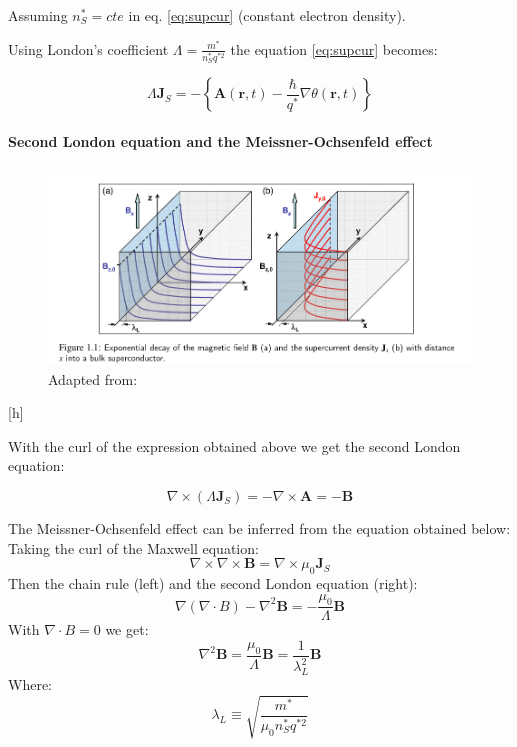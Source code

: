 \documentclass[12pt]{article}
\numberwithin{equation}{subsection}
\begin{document}
Assuming $n^*_S = cte$  in eq. \ref{eq:supcur}  (constant electron density). 


Using London's coefficient $\Lambda = \frac{m^*}{n^*_Sq^{*2}}$ the equation \ref{eq:supcur} becomes:

\begin{equation}
    \Lambda \mathbf J_S = - \left \{ \mathbf A(\mathbf r, t) -\frac{\hbar}{q^*}\nabla\theta (\mathbf r, t) \right \}
    \label{eq:supercurrent}
\end{equation}

\paragraph{Second London equation and the Meissner-Ochsenfeld effect\\}

\begin{figure}[h]
\includegraphics[scale=1.6]{images/second-london.png}
\caption{Adapted from: \cite{gross2016applied}}
\end{figure}[h]

With the curl of the expression obtained above we get the second London equation:

\begin{equation}
    \nabla \times (\Lambda \mathbf J_S) = -\nabla \times \mathbf A = -\mathbf B
\end{equation}

The Meissner-Ochsenfeld effect can be inferred from the equation obtained below: 
Taking the curl of the Maxwell equation:
\begin{equation}
    \nabla \times \nabla \times \mathbf B = \nabla \times \mu_0 \mathbf J_S
\end{equation}
Then the chain rule (left) and the second London equation (right):
\begin{equation}
    \nabla (\nabla \cdot  B) - \nabla^2 \mathbf B = - \frac{\mu_0}{\Lambda} \mathbf B 
\end{equation}
With $\nabla \cdot B =0$ we get:
\begin{equation}
    \nabla^2 \mathbf B = \frac{\mu_0}{\Lambda} \mathbf B = \frac{1}{\lambda_L^2} \mathbf B
\end{equation}
Where:
\begin{equation}
    \lambda_L \equiv \sqrt{\frac{m^*}{\mu_0n^*_Sq^{*2}}}
\end{equation}
\end{document}
